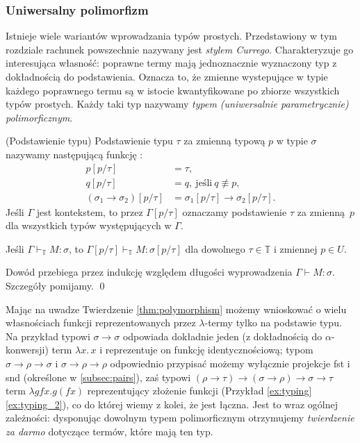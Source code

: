\subsubsection{Uniwersalny polimorfizm}\label{subsec:polymorphism}
Istnieje wiele wariantów wprowadzania typów prostych. Przedstawiony w tym rozdziale rachunek powszechnie nazywany jest \emph{stylem Currego}. Charakteryzuje go interesująca własność: poprawne termy mają jednoznacznie wyznaczony typ z dokładnością do podstawienia. Oznacza to, że zmienne wystepujące w typie każdego poprawnego termu są w istocie kwantyfikowane po zbiorze wszystkich typów prostych. Każdy taki typ nazywamy \emph{typem (uniwersalnie parametrycznie) polimorficznym}.

\begin{definicja}(Podstawienie typu)
Podstawienie typu \(\tau\) za zmienną typową \(p\) w typie \(\sigma\) nazywamy następującą funkcję :
\begin{align*}
  p[p/ \tau] &=\tau,\\
  q[p/ \tau] &=q,\ \text{jeśli}\ q\not\equiv p,\\
  (\sigma_1 \to \sigma_2) [p/\tau] &= \sigma_1 [p/\tau] \to \sigma_2 [p/\tau].
\end{align*}
  Jeśli \(\Gamma\) jest kontekstem, to przez \(\Gamma[p/\tau]\) oznaczamy podstawienie \(\tau\) za zmienną \(p\) dla wszystkich typów występujących w \(\Gamma\).
\end{definicja}

\begin{twierdzenie}\label{thm:polymorphism}
  Jeśli \(\Gamma\vdash_\mathbb{T} M:\sigma\), to \(\Gamma [p/\tau]\vdash_\mathbb{T} M:\sigma[p/\tau]\) dla dowolnego \(\tau\in\mathbb{T}\) i zmiennej \(p\in U\).
\end{twierdzenie}
\begin{dowod}
  Dowód przebiega przez indukcję względem długości wyprowadzenia \(\Gamma\vdash M:\sigma\). Szczegóły pomijamy. \qed
\end{dowod}

Mając na uwadze Twierdzenie \ref{thm:polymorphism} możemy wnioskować o wielu własnościach funkcji reprezentowanych przez \(\lambda\)-termy tylko na podstawie typu. Na przykład typowi \(\sigma\to\sigma\) odpowiada dokładnie jeden (z dokładnością do \(\alpha\)-konwersji) term \(\lambda x.\,x\) i reprezentuje on funkcję identycznościową; typom \(\sigma\to\rho\to\sigma\) i \(\sigma\to\rho\to\rho\) odpowiednio przypisać możemy wyłącznie projekcje fst i snd (określone w \ref{subsec:pairs}), zaś typowi \((\rho\to\tau) \to (\sigma\to\rho)\to\sigma\to\tau\) term \(\lambda g f x. g (f x)\) reprezentujący złożenie funkcji (Przykład \ref{ex:typing} \ref{ex:typing_2}), co do której wiemy z kolei, że jest łączna.
Jest to wraz ogólnej zależności: dysponując dowolnym typem polimorficznym otrzymujemy \emph{twierdzenie za darmo} \cite{Wadler1989} dotyczące termów, które mają ten typ. 

